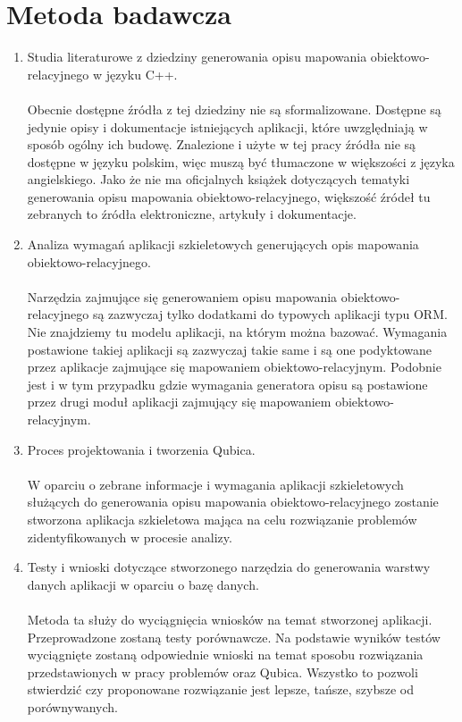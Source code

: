 \documentclass[12pt]{report}
\let\Oldsection\section
\renewcommand{\section}{\FloatBarrier\Oldsection}
\begin{document}
\section{Metoda badawcza}
\begin{enumerate}
\item Studia literaturowe z dziedziny generowania opisu mapowania obiektowo-relacyjnego w języku C++. \\ \\
Obecnie dostępne źródła z tej dziedziny nie są sformalizowane. Dostępne są jedynie opisy i dokumentacje istniejących aplikacji, które uwzględniają
w sposób ogólny ich budowę. Znalezione i użyte w tej pracy źródła nie są dostępne w języku polskim, więc muszą być tłumaczone w większości z języka angielskiego.
Jako że nie ma oficjalnych książek dotyczących tematyki generowania opisu mapowania obiektowo-relacyjnego, większość źródeł tu zebranych to źródła elektroniczne, artykuły i dokumentacje.
\item Analiza wymagań aplikacji szkieletowych generujących opis mapowania obie\-ktowo-relacyjnego. \\ \\
Narzędzia zajmujące się generowaniem opisu mapowania obiektowo-relacyj\-nego są zazwyczaj tylko dodatkami do typowych aplikacji typu ORM. Nie znajdziemy tu
modelu aplikacji, na którym można bazować. Wymagania postawione takiej aplikacji są zazwyczaj takie same i są one podyktowane przez aplikacje zajmujące się mapowaniem obiektowo-relacyjnym. Podobnie jest i w tym przypadku gdzie wymagania generatora opisu są postawione przez drugi moduł aplikacji zajmujący się mapowaniem obiektowo-relacyjnym.
\item Proces projektowania i tworzenia Qubica. \\ \\
W oparciu o zebrane informacje i wymagania aplikacji szkieletowych służą\-cych do generowania opisu mapowania obiektowo-relacyjnego zostanie stworzona aplikacja szkieletowa mająca na celu rozwiązanie problemów zidentyfikowanych w procesie analizy.
\item Testy i wnioski dotyczące stworzonego narzędzia do generowania warstwy danych aplikacji w oparciu o bazę danych. \\ \\
Metoda ta służy do wyciągnięcia wniosków na temat stworzonej aplikacji. Przeprowadzone zostaną testy porównawcze. Na podstawie wyników testów wyciągnięte zostaną odpowiednie wnioski na temat sposobu rozwiązania przedstawionych w pracy problemów oraz Qubica. Wszystko to pozwoli stwierdzić czy proponowane rozwiązanie jest lepsze, tańsze, szybsze od porównywanych.

\end{enumerate}
\end{document}
